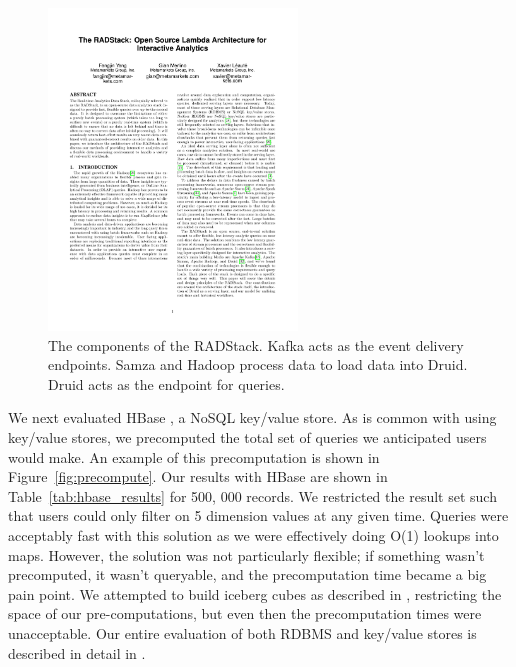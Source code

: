 \documentclass{vldb}
\begin{document}
{\begin{figure}
\centering
\includegraphics[width = 2.6in]{radstack}
\caption{
The components of the RADStack. Kafka acts as the event delivery
endpoints. Samza and Hadoop process data to load data into Druid. Druid acts as
the endpoint for queries.
}
\label{fig:radstack}
\end{figure}

We next evaluated HBase \cite{george2011hbase}, a NoSQL key/value store. As is
common with using key/value stores, we precomputed the total set of queries we
anticipated users would make. An example of this precomputation is shown in
Figure~\ref{fig:precompute}. Our results with HBase are shown in
Table~\ref{tab:hbase_results} for 500, 000 records. We restricted the result
set such that users could only filter on 5 dimension values at any given time.
Queries were acceptably fast with this solution as we were effectively doing
O(1) lookups into maps.  However, the solution was not particularly flexible;
if something wasn't precomputed, it wasn’t queryable, and the precomputation
time became a big pain point. We attempted to build iceberg cubes as described
in \cite{beyer1999bottom}, restricting the space of our pre-computations, but
even then the precomputation times were unacceptable.  Our entire evaluation of
both RDBMS and key/value stores is described in detail in
\cite{tschetter2011druid}.

}
\end{document}
